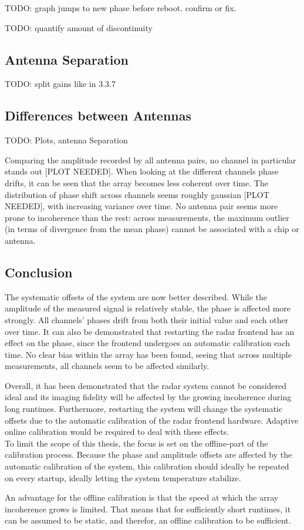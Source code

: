 TODO: graph jumps to new phase before reboot. confirm or fix.

TODO: quantify amount of discontinuity


\subsection{Antenna Separation}
TODO: split gains like in 3.3.7

\subsection{Differences between Antennas}
TODO: Plots, antenna Separation

Comparing the amplitude recorded by all antenna pairs, no channel in particular stands out [PLOT NEEDED].
When looking at the different channels phase drifts, it can be seen that the array becomes less coherent over time.
The distribution of phase shift across channels seems roughly gaussian [PLOT NEEDED], with increasing variance over time.
No antenna pair seems more prone to incoherence than the rest:
across measurements, the maximum outlier (in terms of divergence from the mean phase) cannot be associated with a chip or antenna.

\subsection{Conclusion}
The systematic offsets of the system are now better described.
While the amplitude of the measured signal is relatively stable, the phase is affected more strongly.
All channels' phases drift from both their initial value and each other over time.
It can also be demonstrated that restarting the radar frontend has an effect on the phase, since the frontend undergoes an automatic calibration each time.
No clear bias within the array has been found, seeing that across multiple measurements, all channels seem to be affected similarly.

Overall, it has been demonstrated that the radar system cannot be considered ideal and
its imaging fidelity will be affected by the growing incoherence during long runtimes.
Furthermore, restarting the system will change the systematic offsets due to the automatic calibration of the radar frontend hardware.
Adaptive online calibration would be required to deal with these effects. \\

To limit the scope of this thesis, the focus is set on the offline-part of the calibration process.
Because the phase and amplitude offsets are affected by the automatic calibration of the system,
this calibration should ideally be repeated on every startup, ideally letting the system temperature stabilize.

An advantage for the offline calibration is that the speed at which the array incoherence grows is limited.
That means that for sufficiently short runtimes, it can be assumed to be static, and therefor, an offline calibration to be sufficient.
